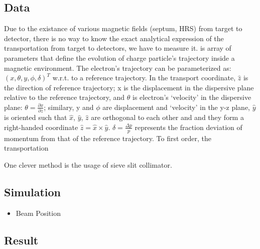 \subsection{Data}
Due to the existance of various magnetic fields (septum, HRS) from target to detector, 
there is no way to know the exact analytical expression of the transportation
from target to detectors, we have to measure it.
is array of parameters that define the evolution of charge particle's trajectory 
inside a magnetic environment. The electron's trajectory can be parameterized
as: $(x, \theta, y, \phi, \delta)^T$ w.r.t. to a reference trajectory.
In the transport coordinate, $\hat{z}$ is the direction of reference trajectory;
x is the displacement in the dispersive plane relative to the reference 
trajectory, and $\theta$ is electron's `velocity' in the dispersive plane:
$\theta = \frac{\partial x}{\partial z}$; similary, y and $\phi$ are displacement
and `velocity' in the y-z plane, $\hat{y}$ is oriented such that $\hat{x}$, 
$\hat{y}$, $\hat{z}$ are orthogonal to each other and and they form a 
right-handed coordinate $\hat{z} = \hat{x} \times \hat{y}$.
$\delta = \frac{\Delta p}{p}$ represents the fraction deviation of momentum
from that of the reference trajectory. To first order, the transportation

One clever method is the usage of sieve slit collimator.

\subsection{Simulation}
\begin{itemize}
    \item Beam Position
\end{itemize}

\subsection{Result}


